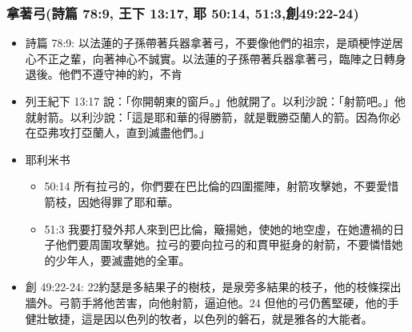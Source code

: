 \subsubsection{拿著弓(詩篇 78:9, 王下 13:17, 耶 50:14, 51:3,創49:22-24)}
\begin{itemize}
\itemsep-.25em
\item 詩篇 78:9: 以法蓮的子孫帶著兵器拿著弓，不要像他們的祖宗，是頑梗悖逆居心不正之輩，向著神心不誠實。以法蓮的子孫帶著兵器拿著弓，臨陣之日轉身退後。他們不遵守神的約，不肯
\item 列王紀下 13:17 說：「你開朝東的窗戶。」他就開了。以利沙說：「射箭吧。」他就射箭。以利沙說：「這是耶和華的得勝箭，就是戰勝亞蘭人的箭。因為你必在亞弗攻打亞蘭人，直到滅盡他們。」
\item 耶利米书
\begin{itemize}
\itemsep-.25em
\item 50:14 所有拉弓的，你們要在巴比倫的四圍擺陣，射箭攻擊她，不要愛惜箭枝，因她得罪了耶和華。
\item 51:3 我要打發外邦人來到巴比倫，簸揚她，使她的地空虛，在她遭禍的日子他們要周圍攻擊她。拉弓的要向拉弓的和貫甲挺身的射箭，不要憐惜她的少年人，要滅盡她的全軍。
\end{itemize}
\item 創 49:22-24: 22約瑟是多結果子的樹枝，是泉旁多結果的枝子，他的枝條探出牆外。弓箭手將他苦害，向他射箭，逼迫他。24 但他的弓仍舊堅硬，他的手健壯敏捷，這是因以色列的牧者，以色列的磐石，就是雅各的大能者。
\end{itemize}

